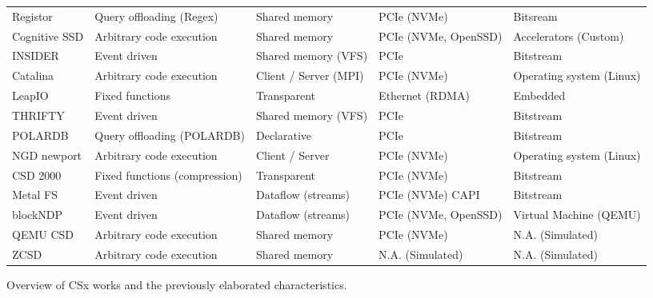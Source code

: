 \begin{table}
\begin{adjustbox}{width=1\textwidth}
\begin{threeparttable}[]
\begin{tabular}{lllll}
                Registor \cite{10.1145/3310149} & Query offloading (Regex) & Shared memory & PCIe (NVMe) & Bitsream \\
                Cognitive SSD \cite{8839401} & Arbitrary code execution & Shared memory & PCIe (NVMe, OpenSSD) & Accelerators (Custom) \\
                INSIDER \cite{234968} & Event driven & Shared memory (VFS) & PCIe & Bitstream \\
                Catalina \cite{8855540} & Arbitrary code execution & Client / Server (MPI) & PCIe (NVMe) & Operating system (Linux) \\
                LeapIO \cite{10.1145/3373376.3378531} & Fixed functions & Transparent & Ethernet (RDMA) & Embedded \\
                THRIFTY \cite{10.1145/3400302.3415723} & Event driven\footnotemark[7] & Shared memory (VFS)\footnotemark[7] & PCIe\footnotemark[7] & Bitstream\footnotemark[7] \\
                POLARDB \cite{246154} & Query offloading (POLARDB) & Declarative & PCIe & Bitstream \\
                NGD newport \cite{10.1145/3415580} & Arbitrary code execution & Client / Server & PCIe (NVMe) & Operating system (Linux) \\
                CSD 2000 \cite{10.1145/3399666.3399934} & Fixed functions (compression) & Transparent & PCIe (NVMe) & Bitstream \\
                Metal FS \cite{10.1145/3342195.3387557} & Event driven & Dataflow (streams) & PCIe (NVMe) \/ CAPI & Bitstream \\
                blockNDP \cite{10.1145/3429357.3430519} & Event driven & Dataflow (streams) & PCIe (NVMe, OpenSSD) & Virtual Machine (QEMU) \\
                QEMU CSD \cite{10.1145/3439839.3459085} & Arbitrary code execution & Shared memory & PCIe (NVMe) & N.A. (Simulated) \\
                ZCSD \cite{lukken2021zcsd} & Arbitrary code execution & Shared memory & N.A. (Simulated) & N.A. (Simulated) \\
                \bottomrule
            \end{tabular}
            \begin{tablenotes}
                \centering Overview of CSx works and the previously elaborated
                characteristics.
            \end{tablenotes}
        \end{threeparttable}
        \label{table:csxoverview}
    \end{adjustbox}
\end{table}

